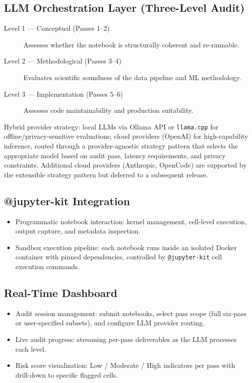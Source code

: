 \documentclass[11pt, a4paper]{article}
\begin{document}
\subsection*{LLM Orchestration Layer (Three-Level Audit)}

\begin{description}
  \item[Level 1 — Conceptual (Passes 1--2)] Assesses whether the notebook is
    structurally coherent and re-runnable.

  \item[Level 2 — Methodological (Passes 3--4)] Evaluates scientific soundness of
    the data pipeline and ML methodology.

  \item[Level 3 — Implementation (Passes 5--6)] Assesses code maintainability and
    production suitability.
\end{description}

\noindent Hybrid provider strategy: local LLMs via Ollama API or \texttt{llama.cpp}
for offline/privacy-sensitive evaluations; cloud providers (OpenAI)
for high-capability inference, routed through a provider-agnostic strategy
pattern that selects the appropriate model based on audit pass, latency requirements,
and privacy constraints. Additional cloud providers (Anthropic, OpenCode) are
supported by the extensible strategy pattern but deferred to a subsequent release.

\subsection*{@jupyter-kit Integration}

\begin{itemize}
  \item Programmatic notebook interaction: kernel management, cell-level execution,
    output capture, and metadata inspection.
  \item Sandbox execution pipeline: each notebook runs inside an isolated Docker
    container with pinned dependencies, controlled by \texttt{@jupyter-kit} cell
    execution commands.
\end{itemize}

\subsection*{Real-Time Dashboard}

\begin{itemize}
  \item Audit session management: submit notebooks, select pass scope (full six-pass
    or user-specified subsets), and configure LLM provider routing.
  \item Live audit progress: streaming per-pass deliverables as the LLM processes
    each level.
  \item Risk score visualization: Low / Moderate / High indicators per pass with
    drill-down to specific flagged cells.
\end{itemize}
\end{document}

